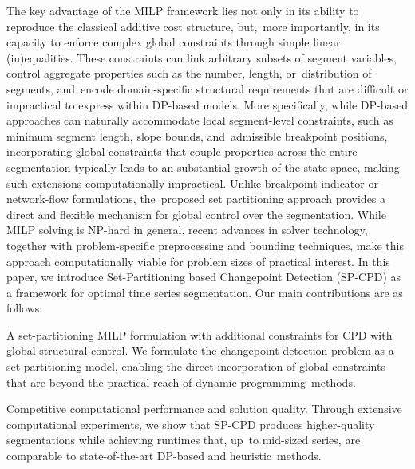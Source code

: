 \documentclass[mathematics,article,accept,pdftex,moreauthors]{Definitions/mdpi}
\begin{document}
{The key advantage of the MILP framework lies not only in its ability to reproduce the classical additive cost structure, but,~more importantly, in its capacity to enforce complex global constraints through simple linear (in)equalities. These constraints can link arbitrary subsets of segment variables, control aggregate properties such as the number, length, or~distribution of segments, and~encode domain-specific structural requirements that are difficult or impractical to express within DP-based models. More specifically, while DP-based approaches can naturally accommodate local segment-level constraints, such as minimum segment length, slope bounds, and~admissible breakpoint positions, incorporating  global constraints that couple properties across the entire segmentation typically leads to an substantial growth of the state space, making such  extensions computationally impractical. Unlike breakpoint-indicator or network-flow formulations, the~proposed set partitioning approach provides a direct and flexible mechanism for global control over the segmentation. While MILP solving is NP-hard in general, recent advances in solver technology, together with problem-specific preprocessing and bounding techniques, make this approach computationally viable for problem sizes of practical interest. }
In this paper, we introduce Set-Partitioning based Changepoint Detection (SP-CPD) as a framework for optimal time series segmentation. Our main contributions are as follows:

A set-partitioning MILP formulation with additional constraints for CPD with global structural control.
We formulate the changepoint detection problem as a set partitioning model, enabling the direct incorporation of global constraints that are beyond the practical reach of dynamic programming~methods.



Competitive computational performance and solution quality.
Through extensive computational experiments, we show that SP-CPD produces higher-quality segmentations while achieving runtimes that, up~to mid-sized series, are comparable to state-of-the-art DP-based and heuristic~methods.
\end{document}
